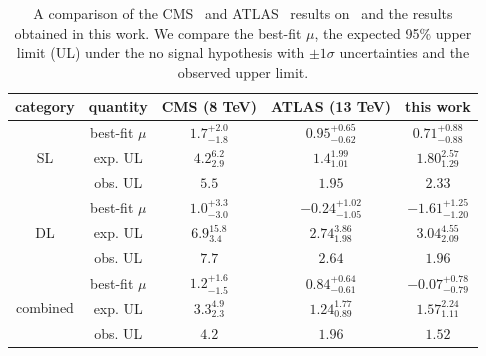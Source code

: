 \begin{table}
\def\arraystretch{1.5}
\begin{center}
\begin{tabular}{cc|ccc}
category & quantity & CMS (8 TeV) & ATLAS (13 TeV) & this work \\
\hline
\multirow{3}{*}{SL} & best-fit $\mu$ & $1.7^{+2.0}_{-1.8}$ & $0.95^{+0.65}_{-0.62}$ & $0.71^{+0.88}_{-0.88}$ \\
 & exp. UL & $4.2^{6.2}_{2.9}$ & $1.4^{1.99}_{1.01}$ & $1.80^{2.57}_{1.29}$ \\
 & obs. UL & $5.5$ & $1.95$ & $2.33$ \\
 \hline
 \multirow{3}{*}{DL} & best-fit $\mu$ & $1.0^{+3.3}_{-3.0}$ & $-0.24^{+1.02}_{-1.05}$ & $-1.61^{+1.25}_{-1.20}$ \\
 & exp. UL & $6.9^{15.8}_{3.4}$ & $2.74^{3.86}_{1.98}$ & $3.04^{4.55}_{2.09}$ \\
 & obs. UL & $7.7$ & $2.64$ & $1.96$ \\
 \hline
 \multirow{3}{*}{combined} & best-fit $\mu$ & $1.2^{+1.6}_{-1.5}$ & $0.84^{+0.64}_{-0.61}$ & $-0.07^{+0.78}_{-0.79} $ \\
 & exp. UL & $3.3^{4.9}_{2.3}$ & $1.24^{1.77}_{0.89}$ & $1.57^{2.24}_{1.11}$ \\
 & obs. UL & $4.2$ & $1.96$ & $1.52$ \\
\end{tabular}
\caption[Comparison of the CMS and ATLAS results on \ttHbb]{A comparison of the CMS~\cite{Khachatryan:2015ila} and ATLAS~\cite{ATLAS:2017nkr} results on \ttHbb~and the results obtained in this work. We compare the best-fit $\mu$, the expected 95\% upper limit (UL) under the no signal hypothesis with $\pm1\sigma$ uncertainties and the observed upper limit.}
\label{tab:tth_results_comparison}
\end{center}
\end{table}

